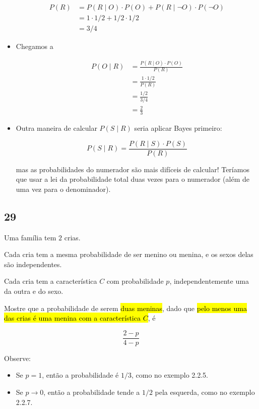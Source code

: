 \documentclass[
  11pt]{report}
\begin{document}
\begin{itemize}
  \[
  \begin{aligned}
  P(R) 
  &= P(R \mid O) \cdot P(O) + P(R \mid \neg O) \cdot P(\neg O) \\
  &= 1 \cdot 1/2 + 1/2 \cdot 1/2 \\
  &= 3/4
  \end{aligned}
  \]
\item
  Chegamos a

  \[
  \begin{aligned}
  P(O \mid R) 
  &= \frac{P(R \mid O) \cdot P(O)}{P(R)} \\
  &= \frac{1 \cdot 1/2}{P(R)} \\
  &= \frac{1/2}{3/4} \\
  &= \frac{2}{3}
  \end{aligned}
  \]
\item
  Outra maneira de calcular $P(S \mid R)$ seria aplicar Bayes primeiro:

  \[
  P(S \mid R) = \frac{P(R \mid S) \cdot P(S)}{P(R)}
  \]

  mas as probabilidades do numerador são mais difíceis de calcular! Teríamos que usar a lei da probabilidade total duas vezes para o numerador (além de uma vez para o denominador).
\end{itemize}

\hypertarget{section-16}{%
\subsection*{29}\label{section-16}}

\begin{rmdbox}

Uma família tem $2$ crias.

Cada cria tem a mesma probabilidade de ser menino ou menina, e os sexos delas são independentes.

Cada cria tem a característica $C$ com probabilidade $p$, independentemente uma da outra e do sexo.

Mostre que a probabilidade de serem {\hl{duas meninas}}, dado que {\hl{pelo menos uma das crias é uma menina com a característica $C$}}, é

\[
\frac{2 - p}{4 - p}
\]

Observe:

\begin{itemize}
\item
  Se $p = 1$, então a probabilidade é $1/3$, como no exemplo 2.2.5.
\item
  Se $p \to 0$, então a probabilidade tende a $1/2$ pela esquerda, como no exemplo 2.2.7.
\end{itemize}

\end{rmdbox}
\end{document}
